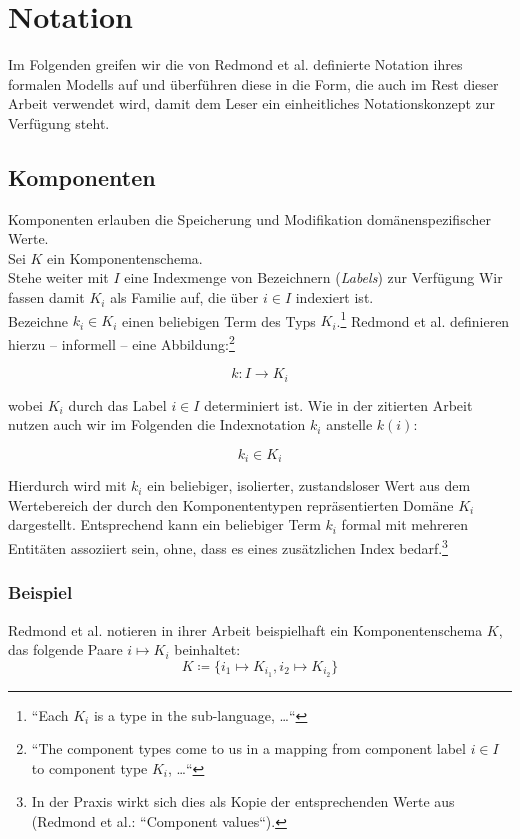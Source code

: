 \section{Notation}

Im Folgenden greifen wir die von Redmond et al. definierte Notation ihres formalen Modells auf und überführen diese in die Form, die auch im Rest dieser Arbeit verwendet wird, damit dem Leser ein einheitliches Notationskonzept zur Verfügung steht.

\subsection{Komponenten}
Komponenten erlauben die Speicherung und Modifikation domänenspezifischer Werte.\\

\noindent
Sei $K$ ein Komponentenschema.\\

\noindent
Stehe weiter mit $I$ eine Indexmenge von Bezeichnern (\textit{Labels}) zur Verfügung
Wir fassen damit $K_i$ als Familie auf, die über $i \in I$ indexiert ist.\\

\noindent
Bezeichne $k_i \in K_i$ einen beliebigen Term des Typs $K_i$.\footnote{``Each $K_i$ is a type in the sub-language, \ldots ``}
Redmond et al. definieren hierzu -- informell -- eine Abbildung:\footnote{
``The component types come to us in a mapping from component label $i \in I$ to component type $K_i$, \ldots ``
}

\[
    k: I \rightarrow K_i
\]

\noindent
wobei $K_i$ durch das Label $i \in I$ determiniert ist.
Wie in der zitierten Arbeit nutzen auch wir im Folgenden die Indexnotation $k_i$ anstelle $k(i)$:

\[
    k_i \in K_i
\]

\noindent
Hierdurch wird mit $k_i$ ein beliebiger, isolierter, zustandsloser Wert aus dem Wertebereich der durch den Komponententypen repräsentierten Domäne $K_i$ dargestellt.
Entsprechend kann ein beliebiger Term $k_i$ formal mit mehreren Entitäten assoziiert sein, ohne, dass es eines zusätzlichen Index bedarf.\footnote{
    In der Praxis wirkt sich dies als Kopie der entsprechenden Werte aus (Redmond et al.: ``Component values``).
}\\

\subsubsection*{Beispiel}
Redmond et al. notieren in ihrer Arbeit beispielhaft ein Komponentenschema $K$, das folgende Paare $i \mapsto K_i$ beinhaltet:
\[
    K \coloneqq \{ i_1 \mapsto K_{i_1}, i_2 \mapsto K_{i_2} \}
\]

